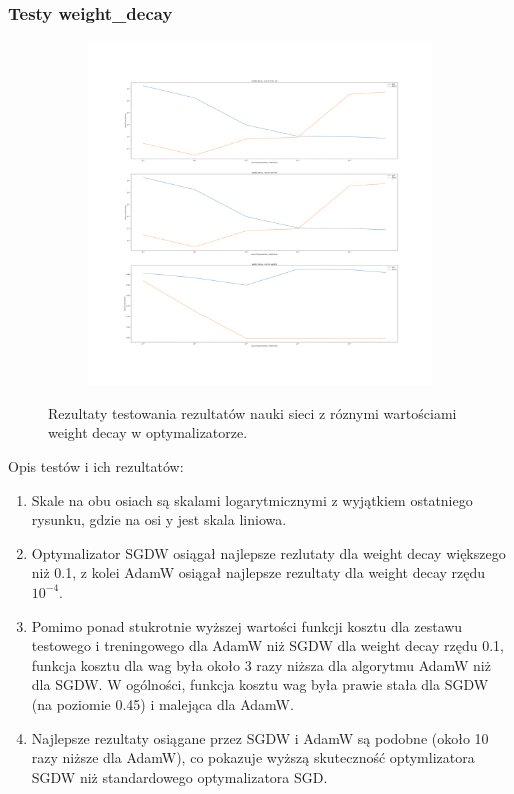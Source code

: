 \documentclass[12pt]{article}
\begin{document}
\subsubsection{Testy weight\_decay}
\begin{figure}[H]
	\centering
	\begin{subfigure}[b]{1\linewidth}
		\includegraphics[width=\linewidth]{Comparision_weight_decay.png}
	\end{subfigure}
	\label{fig:decay}
	\caption{Rezultaty testowania rezultatów nauki sieci z róznymi wartościami weight decay w optymalizatorze.}
\end{figure}
Opis testów i ich rezultatów:
\begin{enumerate}
	\item Skale na obu osiach są skalami logarytmicznymi z wyjątkiem ostatniego rysunku, gdzie na osi y jest skala liniowa.
	\item Optymalizator SGDW osiągał najlepsze rezlutaty dla weight decay większego niż 0.1, z kolei AdamW osiągał najlepsze rezultaty dla weight decay rzędu \(10^{-4}\).
	\item Pomimo ponad stukrotnie wyższej wartości funkcji kosztu dla zestawu testowego i treningowego dla AdamW niż SGDW dla weight decay rzędu 0.1, funkcja kosztu dla wag była około 3 razy niższa dla algorytmu AdamW niż dla SGDW. W ogólności, funkcja kosztu wag była prawie stała dla SGDW (na poziomie 0.45) i malejąca dla AdamW.
	\item Najlepsze rezultaty osiągane przez SGDW i AdamW są podobne (około 10 razy niższe dla AdamW), co pokazuje wyższą skuteczność optymlizatora SGDW niż standardowego optymalizatora SGD.
\end{enumerate}
\end{document}
